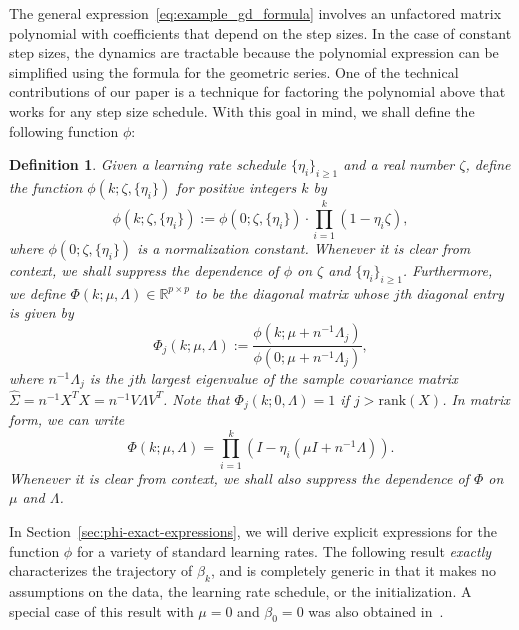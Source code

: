 \documentclass[11pt]{article}
\newtheorem{definition}{Definition}
\begin{document}
The general expression~\eqref{eq:example_gd_formula} involves an unfactored matrix polynomial with coefficients that depend on the step sizes. In the case of constant step sizes, the dynamics are tractable because the polynomial expression can be simplified using the formula for the geometric series.
One of the technical contributions of our paper is a technique for factoring the polynomial above that works for any step size schedule.
With this goal in mind, we shall define the following function $\phi$:

\begin{definition} \label{defn:phi}
Given a learning rate schedule $\{ \eta_i \}_{i \geq 1}$ and a real number $\zeta$, define the function $\phi(k; \zeta, \{ \eta_i \})$ for positive integers $k$ by
\[
    \phi(k;\zeta, \{\eta_i\}) := \phi(0;\zeta, \{\eta_i\}) \cdot \prod_{i=1}^k(1 - \eta_i \zeta),
\]
where $\phi(0; \zeta, \{\eta_i\})$ is a normalization constant. Whenever it is clear from context, we shall suppress the dependence of $\phi$ on $\zeta$ and $\{ \eta_i \}_{i \geq 1}$.
Furthermore, we define $\Phi(k; \mu, \Lambda) \in \mathbb{R}^{p \times p}$ to be the diagonal matrix whose $j$th diagonal entry is given by
\begin{equation} \label{eq:defn_Phi_matrix}
    \Phi_j(k; \mu, \Lambda) := \frac{\phi(k; \mu + n^{-1} \Lambda_j)}{\phi(0;\mu + n^{-1}\Lambda_j)},
\end{equation}
where $n^{-1} \Lambda_j$ is the $j$th largest eigenvalue of the sample covariance matrix $\hat{\Sigma} = n^{-1} X^T X = n^{-1} V \Lambda V^T$. Note that $\Phi_j(k; 0,\Lambda) = 1$ if $j > \mathrm{rank}(X)$. In matrix form, we can write
\begin{equation} \label{eq:defn_Phi_matrix2}
    \Phi(k; \mu, \Lambda) = \prod_{i=1}^k (I - \eta_i (\mu I + n^{-1} \Lambda)).
\end{equation}
Whenever it is clear from context, we shall also suppress the dependence of $\Phi$ on $\mu$ and $\Lambda$. 
\end{definition}

In Section~\ref{sec:phi-exact-expressions}, we will derive explicit expressions for the function $\phi$ for a variety of standard learning rates. 
The following result \emph{exactly} characterizes the trajectory of $\beta_k$, and is completely generic in that it makes no assumptions on the data, the learning rate schedule, or the initialization. A special case of this result with $\mu = 0$ and $\beta_0 = 0$ was also obtained in~\cite{raskutti2014early}.
\end{document}
